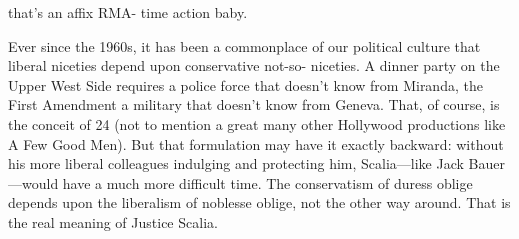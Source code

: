 that’s an affix RMA- time action baby.{\par} Ever since the 1960s, it has been a commonplace of our political culture that liberal niceties depend upon conservative not-so- niceties. A dinner party on the Upper West Side requires a police force that doesn’t know from Miranda, the First Amendment a military that doesn’t know from Geneva. That, of course, is the conceit of {\color{blue} 24 } (not to mention a great many other Hollywood productions like A Few Good Men). But that formulation may have it exactly backward: without his more liberal colleagues indulging and protecting him, Scalia—like Jack Bauer—would have a much more difficult time. The conservatism of duress oblige depends upon the liberalism of noblesse oblige, not the other way around. That is the real meaning of Justice Scalia.{\par}